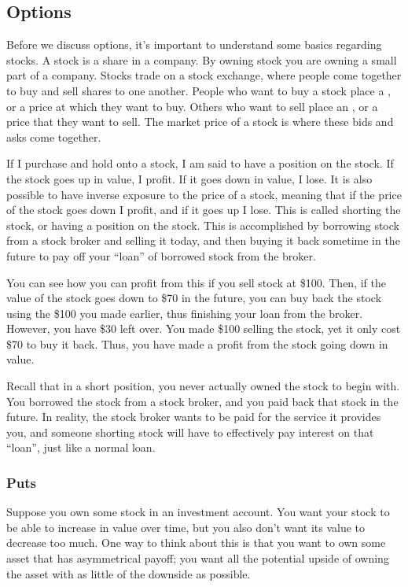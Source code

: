 \documentclass[letterpaper,10pt,english]{jupyterBook}
\begin{document}
\subsection{Options}
\label{\detokenize{content/10-finance/options:options}}\label{\detokenize{content/10-finance/options::doc}}
\sphinxAtStartPar
Before we discuss options, it’s important to understand some basics regarding stocks. A stock is a share in a company. By owning stock you are owning a small part of a company. Stocks trade on a stock exchange, where people come together to buy and sell shares to one another. People who want to buy a stock place a , or a price at which they want to buy. Others who want to sell place an , or a price that they want to sell. The market price of a stock is where these bids and asks come together.

\sphinxAtStartPar
If I purchase and hold onto a stock, I am said to have a  position on the stock. If the stock goes up in value, I profit. If it goes down in value, I lose. It is also possible to have inverse exposure to the price of a stock, meaning that if the price of the stock goes down I profit, and if it goes up I lose. This is called shorting the stock, or having a  position on the stock. This is accomplished by borrowing stock from a stock broker and selling it today, and then buying it back sometime in the future to pay off your “loan” of borrowed stock from the broker.

\sphinxAtStartPar
You can see how you can profit from this if you sell stock at \$100. Then, if the value of the stock goes down to \$70 in the future, you can buy back the stock using the \$100 you made earlier, thus finishing your loan from the broker. However, you have \$30 left over. You made \$100 selling the stock, yet it only cost \$70 to buy it back. Thus, you have made a profit from the stock going down in value.

\sphinxAtStartPar
Recall that in a short position, you never actually owned the stock to begin with. You borrowed the stock from a stock broker, and you paid back that stock in the future. In reality, the stock broker wants to be paid for the service it provides you, and someone shorting stock will have to effectively pay interest on that “loan”, just like a normal loan.


\subsubsection{Puts}
\label{\detokenize{content/10-finance/options:puts}}
\sphinxAtStartPar
Suppose you own some stock in an investment account. You want your stock to be able to increase in value over time, but you also don’t want its value to decrease too much. One way to think about this is that you want to own some asset that has asymmetrical payoff; you want all the potential upside of owning the asset with as little of the downside as possible.
\end{document}
